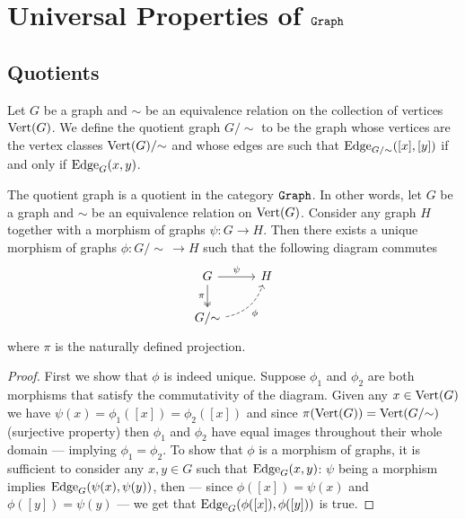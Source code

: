 \section{Universal Properties of \texorpdfstring{\({\texttt{Graph}}\)}{Graph}}

\subsection{Quotients}

\begin{definition}[Quotient]\label{def: quotient-graph}
  Let \(G\) be a graph and \(\sim\) be an equivalence relation on the collection
  of vertices \(\operatorname{Vert}(G)\). We define the quotient graph \(G/{\sim}\) to be the graph
  whose vertices are the vertex classes \(\operatorname{Vert}(G)/{\sim}\) and whose edges are
  such that \(\operatorname{Edge}_{G/{\sim}}([x], [y])\) if and only if \(\operatorname{Edge}_G(x, y)\).
\end{definition}

\begin{proposition}
  \label{prop: quotient-graph}
  The quotient graph is a quotient in the category \({\texttt{Graph}}\). In other words,
  let \(G\) be a graph and \(\sim\) be an equivalence relation on \(\operatorname{Vert}(G)\).
  Consider any graph \(H\) together with a morphism of graphs \(\psi: G \to H\).
  Then there exists a unique morphism of graphs \(\phi: G/{\sim}\, \to H\) such
  that the following diagram commutes
  \[
    \begin{tikzcd}
      G \ar[d, two heads, swap, "\pi"] \ar[r, "\psi"] &H \\
      G/{\sim} \ar[ur, swap, bend right, dashed, "\phi"] &
    \end{tikzcd}
  \]
  where \(\pi\) is the naturally defined projection.
\end{proposition}

\begin{proof}
  First we show that \(\phi\) is indeed unique. Suppose \(\phi_1\) and
  \(\phi_2\) are both morphisms that satisfy the commutativity of the diagram.
  Given any \(x \in \operatorname{Vert}(G)\) we have \(\psi(x) = \phi_1([x]) = \phi_2([x])\) and
  since \(\pi(\operatorname{Vert}(G)) = \operatorname{Vert}(G/{\sim})\) (surjective property) then \(\phi_1\) and
  \(\phi_2\) have equal images throughout their whole domain --- implying
  \(\phi_1 = \phi_2\). To show that \(\phi\) is a morphism of graphs, it is
  sufficient to consider any \(x, y \in G\) such that \(\operatorname{Edge}_G(x, y)\): \(\psi\)
  being a morphism implies \(\operatorname{Edge}_G(\psi(x), \psi(y))\), then --- since \(\phi([x])
  = \psi(x)\) and \(\phi([y]) = \psi(y)\) --- we get that \(\operatorname{Edge}_G(\phi([x]),
  \phi([y]))\) is true.
\end{proof}

